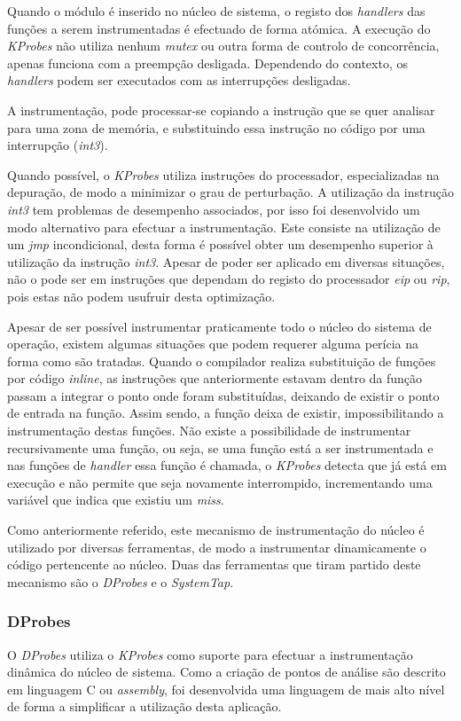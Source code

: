 Quando o módulo é inserido no núcleo de sistema, o registo dos \textit{handlers} das funções a serem instrumentadas é efectuado de forma atómica.
A execução do \textit{KProbes} não utiliza nenhum \textit{mutex} ou outra forma de controlo de concorrência, apenas funciona com a preempção desligada.
Dependendo do contexto, os \textit{handlers} podem ser executados com as interrupções desligadas.

A instrumentação, pode processar-se copiando a instrução que se quer analisar para uma zona de memória, e substituindo essa instrução no código por uma interrupção (\textit{int3}).

Quando possível, o \textit{KProbes} utiliza instruções do processador, especializadas na depuração, de modo a minimizar o grau de perturbação.
A utilização da instrução \textit{int3} tem problemas de desempenho associados, por isso foi desenvolvido um modo alternativo para efectuar a instrumentação.
Este consiste na utilização de um \textit{jmp} incondicional, desta forma é possível obter um desempenho superior à utilização da instrução \textit{int3}.
Apesar de poder ser aplicado em diversas situações, não o pode ser em instruções que dependam do registo do processador \textit{eip} ou \textit{rip}, pois estas não podem usufruir desta optimização.

Apesar de ser possível instrumentar praticamente todo o núcleo do sistema de operação, existem algumas situações que podem requerer alguma perícia na forma como são tratadas.
Quando o compilador realiza substituição de funções por código \textit{inline}, as instruções que anteriormente estavam dentro da função passam a integrar o ponto onde foram substituídas, deixando de existir o ponto de entrada na função.
Assim sendo, a função deixa de existir, impossibilitando a instrumentação destas funções.
Não existe a possibilidade de instrumentar recursivamente uma função, ou seja, se uma função está a ser instrumentada e nas funções de \textit{handler} essa função é chamada, o \textit{KProbes} detecta que já está em execução e não permite que seja novamente interrompido, incrementando uma variável que indica que existiu um \textit{miss}.

Como anteriormente referido, este mecanismo de instrumentação do núcleo é utilizado por diversas ferramentas, de modo a instrumentar dinamicamente o código pertencente ao núcleo.
Duas das ferramentas que tiram partido deste mecanismo são o \textit{DProbes} e o \textit{SystemTap}.

\subsubsection{DProbes}
O \textit{DProbes} utiliza o \textit{KProbes} como suporte para efectuar a instrumentação dinâmica do núcleo de sistema.
Como a criação de pontos de análise são descrito em linguagem C ou \textit{assembly}, foi desenvolvida uma linguagem de mais alto nível de forma a simplificar a utilização desta aplicação.

